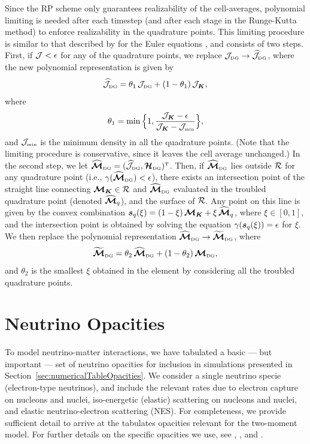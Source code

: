 \documentclass[10pt,preprint]{aastex}
\begin{document}
Since the RP scheme only guarantees realizability of the cell-averages, polynomial limiting is needed after each timestep (and after each stage in the Runge-Kutta method) to enforce realizability in the quadrature points.  
This limiting procedure is similar to that described by \citet{ZS2010a} for the Euler equations \citep[see also][]{liuOsher_1996}, and consists of two steps.  
First, if $\mathcal{J}<\epsilon$ for any of the quadrature points, we replace $\mathcal{J}_{\mbox{\tiny DG}}\to\widehat{\mathcal{J}}_{\mbox{\tiny DG}}$, where the new polynomial representation is given by
\begin{equation}
  \widehat{\mathcal{J}}_{\mbox{\tiny DG}}=\theta_{1}\,\mathcal{J}_{\mbox{\tiny DG}}+(1-\theta_{1})\,\mathcal{J}_{\boldsymbol{K}},
\end{equation}
where
\begin{equation}
  \theta_{1}=\min\Big\{1,\frac{\mathcal{J}_{\boldsymbol{K}}-\epsilon}{\mathcal{J}_{\boldsymbol{K}}-\mathcal{J}_{\mbox{\tiny min}}}\Big\},
\end{equation}
and $\mathcal{J}_{\mbox{\tiny min}}$ is the minimum density in all the quadrature points.  
(Note that the limiting procedure is conservative, since it leaves the cell average unchanged.)  
In the second step, we let $\widehat{\boldsymbol{\mathcal{M}}}_{\mbox{\tiny DG}}=(\widehat{\mathcal{J}}_{\mbox{\tiny DG}},\boldsymbol{\mathcal{H}}_{\mbox{\tiny DG}})^{\mbox{\tiny T}}$.  
Then, if $\widehat{\boldsymbol{\mathcal{M}}}_{\mbox{\tiny DG}}$ lies outside $\mathcal{R}$ for any quadrature point (i.e., $\gamma(\widehat{\boldsymbol{\mathcal{M}}}_{\mbox{\tiny DG}})<\epsilon$), there exists an intersection point of the straight line connecting $\boldsymbol{\mathcal{M}}_{\boldsymbol{K}}\in\mathcal{R}$ and $\widehat{\boldsymbol{\mathcal{M}}}_{\mbox{\tiny DG}}$ evaluated in the troubled quadrature point (denoted $\widehat{\boldsymbol{\mathcal{M}}}_{q}$), and the surface of $\mathcal{R}$.  
Any point on this line is given by the convex combination $\boldsymbol{s}_{q}(\xi)=(1-\xi)\,\boldsymbol{\mathcal{M}}_{\boldsymbol{K}}+\xi\,\widehat{\boldsymbol{\mathcal{M}}}_{q}$, where $\xi\in[0,1]$, and the intersection point is obtained by solving the equation $\gamma(\boldsymbol{s}_{q}(\xi))=\epsilon$ for $\xi$.  
We then replace the polynomial representation $\widehat{\boldsymbol{\mathcal{M}}}_{\mbox{\tiny DG}}\to\widetilde{\boldsymbol{\mathcal{M}}}_{\mbox{\tiny DG}}$, where
\begin{equation}
  \widetilde{\boldsymbol{\mathcal{M}}}_{\mbox{\tiny DG}}=\theta_{2}\,\widehat{\boldsymbol{\mathcal{M}}}_{\mbox{\tiny DG}}+(1-\theta_{2})\,\boldsymbol{\mathcal{M}}_{\mbox{\tiny DG}},
\end{equation}
and $\theta_{2}$ is the smallest $\xi$ obtained in the element by considering all the troubled quadrature points.  

\section{Neutrino Opacities}
\label{sec:opacities}

To model neutrino-matter interactions, we have tabulated a basic --- but important --- set of neutrino opacities for inclusion in simulations presented in Section~\ref{sec:numericalTableOpacities}.  
We consider a single neutrino specie (electron-type neutrinos), and include the relevant rates due to electron capture on nucleons and nuclei, iso-energetic (elastic) scattering on nucleons and nuclei, and elastic neutrino-electron scattering (NES).  
For completeness, we provide sufficient detail to arrive at the tabulates opacities relevant for the two-moment model.  
For further details on the specific opacities we use, see \citet{bruenn_1985}, \citet{mezzacappaBruenn_1993a}, and \citet{mezzacappaBruenn_1993c}.  
\end{document}
